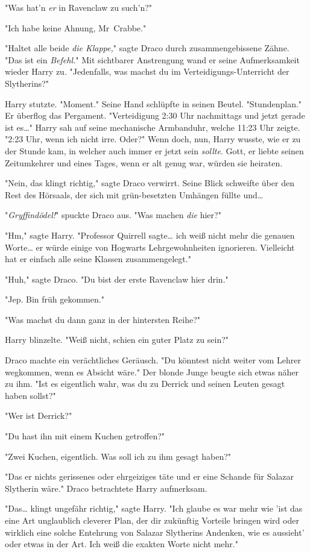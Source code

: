 {"Was hat'n \emph{er} in Ravenclaw zu such'n?"

"Ich habe keine Ahnung, Mr~Crabbe."

"Haltet alle beide \emph{die Klappe,}" sagte Draco durch zusammengebissene Zähne. "Das ist ein \emph{Befehl.}" Mit sichtbarer Anstrengung wand er seine Aufmerksamkeit wieder Harry zu. "Jedenfalls, was machst du im Verteidigungs-Unterricht der Slytherins?"

Harry stutzte. "Moment." Seine Hand schlüpfte in seinen Beutel. "Stundenplan." Er überflog das Pergament. "Verteidigung 2:30 Uhr nachmittags und jetzt gerade ist es…" Harry sah auf seine mechanische Armbanduhr, welche 11:23 Uhr zeigte. "2:23 Uhr, wenn ich nicht irre. Oder?" Wenn doch, nun, Harry wusste, wie er zu der Stunde kam, in welcher auch immer er jetzt sein \emph{sollte}. Gott, er liebte seinen Zeitumkehrer und eines Tages, wenn er alt genug war, würden sie heiraten.

"Nein, das klingt richtig," sagte Draco verwirrt. Seine Blick schweifte über den Rest des Hörsaals, der sich mit grün-besetzten Umhängen füllte und…

"\emph{Gryffindödel!}" spuckte Draco aus. "Was machen \emph{die} hier?"

"Hm," sagte Harry. "Professor Quirrell sagte… ich weiß nicht mehr die genauen Worte… er würde einige von Hogwarts Lehrgewohnheiten ignorieren. Vielleicht hat er einfach alle seine Klassen zusammengelegt."

"Huh," sagte Draco. "Du bist der erste Ravenclaw hier drin."

"Jep. Bin früh gekommen."

"Was machst du dann ganz in der hintersten Reihe?"

Harry blinzelte. "Weiß nicht, schien ein guter Platz zu sein?"

Draco machte ein verächtliches Geräusch. "Du könntest nicht weiter vom Lehrer wegkommen, wenn es Absicht wäre." Der blonde Junge beugte sich etwas näher zu ihm. "Ist es eigentlich wahr, was du zu Derrick und seinen Leuten gesagt haben sollst?"

"Wer ist Derrick?"

"Du hast ihn mit einem Kuchen getroffen?"

"Zwei Kuchen, eigentlich. Was soll ich zu ihm gesagt haben?"

"Das er nichts gerissenes oder ehrgeiziges täte und er eine Schande für Salazar Slytherin wäre." Draco betrachtete Harry aufmerksam.

"Das… klingt ungefähr richtig," sagte Harry. "Ich glaube es war mehr wie 'ist das eine Art unglaublich cleverer Plan, der dir zukünftig Vorteile bringen wird oder wirklich eine solche Entehrung von Salazar Slytherins Andenken, wie es aussieht' oder etwas in der Art. Ich weiß die exakten Worte nicht mehr."

}

